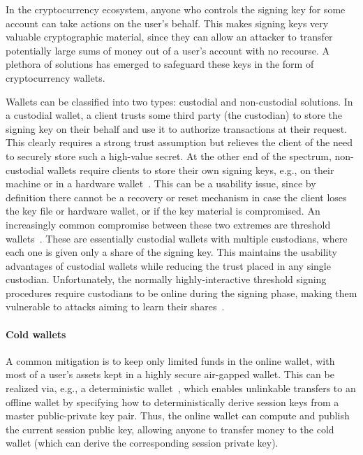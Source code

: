 In the cryptocurrency ecosystem, anyone who controls the signing key for some account can take actions on the user's behalf. This makes signing keys very valuable cryptographic material, since they can allow an attacker to transfer potentially large sums of money out of a user's account with no recourse. A plethora of solutions has emerged to safeguard these keys in the form of cryptocurrency wallets.

Wallets can be classified into two types: custodial and non-custodial solutions. In a custodial wallet, a client trusts some third party (the custodian) to store the signing key on their behalf and use it to authorize transactions at their request. This clearly requires a strong trust assumption but relieves the client of the need to securely store such a high-value secret. At the other end of the spectrum, non-custodial wallets require clients to store their own signing keys, e.g., on their machine or in a hardware wallet~\cite{FC:AGKK19}. This can be a usability issue, since by definition there cannot be a recovery or reset mechanism in case the client loses the key file or hardware wallet, or if the key material is compromised. An increasingly common compromise between these two extremes are threshold wallets~\cite{SP:KMOS21,EPRINT:DEFLR23,EPRINT:BloMakPel22,EPRINT:Eyal21}. These are essentially custodial wallets with multiple custodians, where each one is given only a share of the signing key. This maintains the usability advantages of custodial wallets while reducing the trust placed in any single custodian.
Unfortunately, the normally highly-interactive threshold signing procedures require custodians to be online during the signing phase, making them vulnerable to attacks aiming to learn their shares~\cite{ecdsa-threshold-attack,NIST-MPC-Attack}.

\paragraph{Cold wallets}
A common mitigation is to keep only limited funds in the online wallet, with most of a user's assets kept in a highly secure air-gapped wallet. This can be realized via, e.g., a deterministic wallet~\cite{deterministic-wallets,CCS:DasFauLos19,CCS:ADEFKRS20,EPRINT:Hu23,ESORICS:ErwRia22}, which enables unlinkable transfers to an offline wallet by specifying how to deterministically derive session keys from a master public-private key pair. Thus, the online wallet can compute and publish the current session public key, allowing anyone to transfer money to the cold wallet (which can derive the corresponding session private key). 

